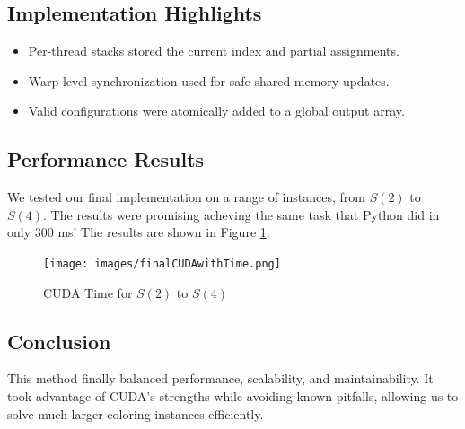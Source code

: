 \documentclass[12pt]{article}
\begin{document}
\subsection{Implementation Highlights}
\begin{itemize}
    \item Per-thread stacks stored the current index and partial assignments.
    \item Warp-level synchronization used for safe shared memory updates.
    \item Valid configurations were atomically added to a global output array.
\end{itemize}

\subsection{Performance Results}
We tested our final implementation on a range of instances, from $S(2)$ to $S(4)$. The results were promising acheving the same task that Python did in only 300 ms! The results are shown in Figure \ref{fig:cudaTime}.

\begin{figure}[h]
    \centering
    \texttt{[image: images/finalCUDAwithTime.png]}
    \caption{CUDA Time for $S(2)$ to $S(4)$}
    \label{fig:cudaTime}
\end{figure}
\subsection{Conclusion}
This method finally balanced performance, scalability, and maintainability. It took advantage of CUDA’s strengths while avoiding known pitfalls, allowing us to solve much larger coloring instances efficiently.
\end{document}
